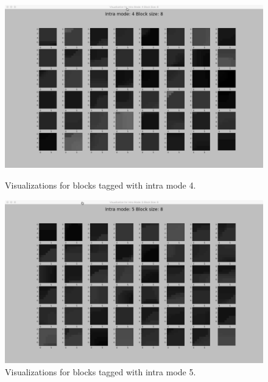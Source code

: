     \begin{figure}
    
        \vspace*{1cm} %
        
        \begin{minipage}{0.49\textwidth}
            \includegraphics[width=\linewidth]{Figures/visu-size8x8/8-4}
            \caption[Visualizations for blocks tagged with intra mode 4]{Visualizations for blocks tagged with intra mode 4.}
            \label{fig:size8_mode4}
        \end{minipage}
        \hspace{\fill} %
        \begin{minipage}{0.49\textwidth}
            \includegraphics[width=\linewidth]{Figures/visu-size8x8/8-5}
            \caption[Visualizations for blocks tagged with intra mode 5]{Visualizations for blocks tagged with intra mode 5.}
            \label{fig:size8_mode5}
        \end{minipage}
    

\end{figure}
